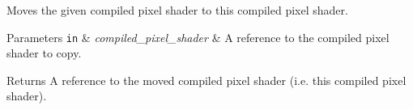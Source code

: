 Moves the given compiled pixel shader to this compiled pixel shader.


\begin{DoxyParams}[1]{Parameters}
\mbox{\tt in}  & {\em compiled\+\_\+pixel\+\_\+shader} & A reference to the compiled pixel shader to copy. \\
\hline
\end{DoxyParams}
\begin{DoxyReturn}{Returns}
A reference to the moved compiled pixel shader (i.\+e. this compiled pixel shader). 
\end{DoxyReturn}
